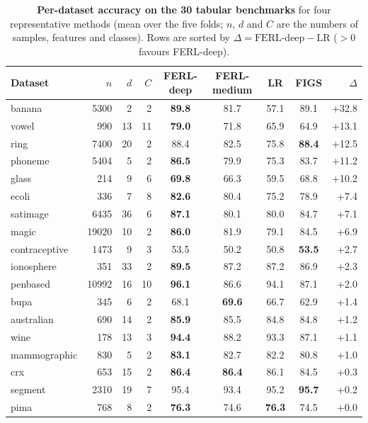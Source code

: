 \begin{table}[t]
\centering
\footnotesize
\setlength{\tabcolsep}{3pt}
\caption{\textbf{Per-dataset accuracy on the 30 tabular benchmarks} for four representative methods (mean over the five folds; $n$, $d$ and $C$ are the numbers of samples, features and classes). Rows are sorted by $\Delta=\text{FERL-deep}-\text{LR}$ ($>0$ favours FERL-deep).}
\label{tab:supp-frontier-nuance}
\begin{tabular}{@{}lrrrccccr@{}}
\toprule
Dataset & $n$ & $d$ & $C$ & FERL-deep & FERL-medium & LR & FIGS & $\Delta$\\
\midrule
banana & 5300 & 2 & 2 & \textbf{89.8} & 81.7 & 57.1 & 89.1 & +32.8\\
vowel & 990 & 13 & 11 & \textbf{79.0} & 71.8 & 65.9 & 64.9 & +13.1\\
ring & 7400 & 20 & 2 & 88.4 & 82.5 & 75.8 & \textbf{88.4} & +12.5\\
phoneme & 5404 & 5 & 2 & \textbf{86.5} & 79.9 & 75.3 & 83.7 & +11.2\\
glass & 214 & 9 & 6 & \textbf{69.8} & 66.3 & 59.5 & 68.8 & +10.2\\
ecoli & 336 & 7 & 8 & \textbf{82.6} & 80.4 & 75.2 & 78.9 & +7.4\\
satimage & 6435 & 36 & 6 & \textbf{87.1} & 80.1 & 80.0 & 84.7 & +7.1\\
magic & 19020 & 10 & 2 & \textbf{86.0} & 81.9 & 79.1 & 84.5 & +6.9\\
contraceptive & 1473 & 9 & 3 & 53.5 & 50.2 & 50.8 & \textbf{53.5} & +2.7\\
ionosphere & 351 & 33 & 2 & \textbf{89.5} & 87.2 & 87.2 & 86.9 & +2.3\\
penbased & 10992 & 16 & 10 & \textbf{96.1} & 86.6 & 94.1 & 87.1 & +2.0\\
bupa & 345 & 6 & 2 & 68.1 & \textbf{69.6} & 66.7 & 62.9 & +1.4\\
australian & 690 & 14 & 2 & \textbf{85.9} & 85.5 & 84.8 & 84.8 & +1.2\\
wine & 178 & 13 & 3 & \textbf{94.4} & 88.2 & 93.3 & 87.1 & +1.1\\
mammographic & 830 & 5 & 2 & \textbf{83.1} & 82.7 & 82.2 & 80.8 & +1.0\\
crx & 653 & 15 & 2 & \textbf{86.4} & \textbf{86.4} & 86.1 & 84.5 & +0.3\\
segment & 2310 & 19 & 7 & 95.4 & 93.4 & 95.2 & \textbf{95.7} & +0.2\\
pima & 768 & 8 & 2 & \textbf{76.3} & 74.6 & \textbf{76.3} & 74.5 & +0.0\\

\end{tabular}
\end{table}
